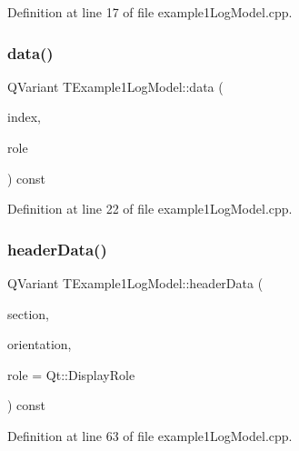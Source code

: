 Definition at line 17 of file example1\+Log\+Model.\+cpp.

\mbox{\label{class_t_example1_log_model_af60e29db85fceba45bc87abbc70cb322}} 
\subsubsection{\texorpdfstring{data()}{data()}}
{\footnotesize\ttfamily Q\+Variant T\+Example1\+Log\+Model\+::data (\begin{DoxyParamCaption}\item[{const Q\+Model\+Index \&}]{index,  }\item[{int}]{role }\end{DoxyParamCaption}) const}



Definition at line 22 of file example1\+Log\+Model.\+cpp.

\mbox{\label{class_t_example1_log_model_adb2eb0cb6da284368ee357e6e737c48c}} 
\subsubsection{\texorpdfstring{header\+Data()}{headerData()}}
{\footnotesize\ttfamily Q\+Variant T\+Example1\+Log\+Model\+::header\+Data (\begin{DoxyParamCaption}\item[{int}]{section,  }\item[{Qt\+::\+Orientation}]{orientation,  }\item[{int}]{role = {\ttfamily Qt\+:\+:DisplayRole} }\end{DoxyParamCaption}) const}



Definition at line 63 of file example1\+Log\+Model.\+cpp.

\mbox{\label{class_t_example1_log_model_ac65587677b307f28f624491de852177a}} 
